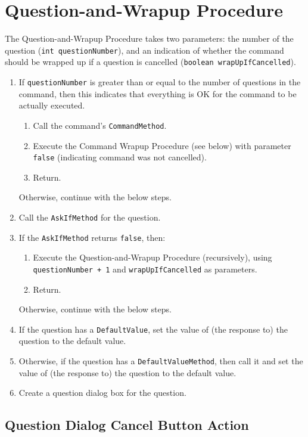 \documentclass[11pt]{article}
\begin{document}
\section{Question-and-Wrapup Procedure}

The Question-and-Wrapup Procedure takes two parameters: the number of the
question ({\tt int questionNumber}), and an indication of whether the
command should be wrapped up if a question is cancelled
({\tt boolean wrapUpIfCancelled}).

\begin{enumerate}
\item If {\tt questionNumber} is greater than or equal to the number
  of questions in the command, then this indicates that everything
  is OK for the command to be actually executed.
  \begin{enumerate}
  \item Call the command's {\tt CommandMethod}.
  \item Execute the Command Wrapup Procedure (see below) with parameter
    {\tt false} (indicating command was not cancelled).
  \item Return.
  \end{enumerate}
  Otherwise, continue with the below steps.
\item Call the {\tt AskIfMethod} for the question.
\item If the {\tt AskIfMethod} returns {\tt false}, then:
  \begin{enumerate}
  \item Execute the Question-and-Wrapup Procedure
    (recursively), using {\tt questionNumber + 1} and {\tt wrapUpIfCancelled}
    as parameters.
  \item Return.
  \end{enumerate}
  Otherwise, continue with the below steps.
\item If the question  has a {\tt DefaultValue}, set the value of
  (the response to) the question to the default value.
\item Otherwise, if the question has a {\tt DefaultValueMethod}, then call it
  and set the value of (the response to) the question to
  the default value.
\item Create a question dialog box for the question.
\end{enumerate}

\subsection{Question Dialog Cancel Button Action}
\end{document}
